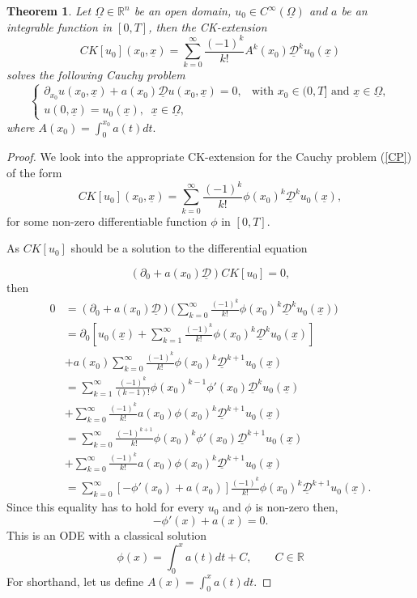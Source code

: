 \documentclass[12pt]{amsart}
\newcommand{\D}{\mathcal{D}}
\newtheorem{theorem}{Theorem}[section]
\theoremstyle{definition}
\newcommand{\R}{\mathbb{R}}
\newcommand{\un}{\underline}
\begin{document}
\begin{theorem}
    Let $\un{\Omega}\in \R^n$ be an open domain, $u_0 \in C^\infty(\un{\Omega})$ and $a$ be an integrable function in $[0,T]$, then the CK-extension
    \[
        CK[u_0](x_0, \un x) = \sum_{k = 0}^\infty \frac{(-1)^k}{k!}A^k(x_0)\un{\D}^ku_0(\un{x})
    \]
    solves the following Cauchy problem
    \[
    \begin{cases}
    \partial_{x_0} u(x_0,\un{x}) + a(x_0)\un{\D} u(x_0,\un{x}) = 0, & \text{with } x_0 \in (0, T] \text{ and } \un{x} \in \un{\Omega}, \\
    u(0,\un{x}) = u_0(\un{x}),\;\; \un{x}\in \un{\Omega},
    \end{cases}    \]
     where $A(x_0) = \int_0^{x_0} a(t) dt.$ 

    
\end{theorem}
\begin{proof}
We look into the %
appropriate CK-extension for the Cauchy problem (\ref{CP}) %
of the form
\[
CK[u_0](x_0, \un{x})=\sum_{k = 0}^\infty \frac{(-1)^k}{k!}\phi(x_0)^k\un{\D}^ku_0(\un{x}),
\]
for some non-zero differentiable function $\phi$ in $[0,T]$.

As $CK[u_0]$ should be a solution to the differential equation

\[
(\partial_0 + a(x_0)\un{\D})CK[u_0] =0,
\]
then
\begin{align*}
    0 
    &= (\partial_0 + a(x_0)\un{\D})\Big(\sum_{k = 0}^\infty \frac{(-1)^k}{k!}\phi(x_0)^k\un{\D}^ku_0(\un{x}) \Big) \\
   & = \partial_0[u_0(\un{x}) + \sum_{k = 1}^\infty \frac{(-1)^k}{k!}\phi(x_0)^k\un{\D}^ku_0(\un{x})]\\
    &+a(x_0)\sum_{k = 0}^\infty \frac{(-1)^k}{k!}\phi(x_0)^k\un{\D}^{k+1}u_0(\un{x}) \\
      & = \sum_{k = 1}^\infty \frac{(-1)^k}{(k-1)!}\phi(x_0)^{k-1}\phi'(x_0)\un{\D}^ku_0(\un{x}) \\
    &+\sum_{k = 0}^\infty \frac{(-1)^k}{k!}a(x_0)\phi(x_0)^k\un{\D}^{k+1}u_0(\un{x}) \\
    &= \sum_{k = 0}^\infty \frac{(-1)^{k+1}}{k!}\phi(x_0)^k\phi'(x_0)\un{\D}^{k+1}u_0(\un{x}) \\
    &+\sum_{k = 0}^\infty \frac{(-1)^k}{k!}a(x_0)\phi(x_0)^k\un{\D}^{k+1}u_0(\un{x}) \\
    &= \sum_{k = 0}^\infty [-\phi'(x_0) + a(x_0)]\frac{(-1)^k}{k!}\phi(x_0)^k\un{\D}^{k+1}u_0(\un{x}).
\end{align*}
Since this equality has to hold for every $u_0$ and $\phi$ is non-zero then,
\[  
-\phi'(x) + a(x) = 0. 
\]
This is an ODE with a classical solution
\[
\phi(x) = \int_0^x a(t) dt + C, \qquad C\in \mathbb{R}
\]
For shorthand, let us define $A(x) = \int_0^x a(t) dt$.


\end{proof}
\end{document}
